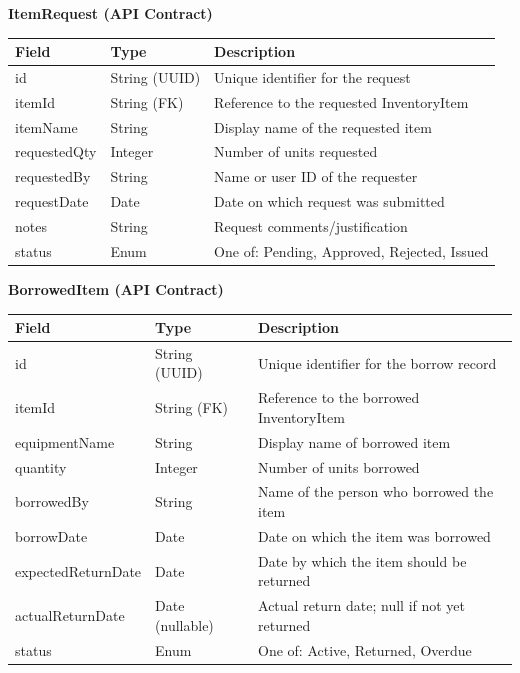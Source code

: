 \documentclass[12pt]{article}
\begin{document}
\textbf{ItemRequest (API Contract)}

\begin{center}
\begin{tabular}{|l|l|p{7cm}|}
\hline
\textbf{Field} & \textbf{Type} & \textbf{Description} \\
\hline
id & String (UUID) & Unique identifier for the request \\
itemId & String (FK) & Reference to the requested InventoryItem \\
itemName & String & Display name of the requested item \\
requestedQty & Integer & Number of units requested \\
requestedBy & String & Name or user ID of the requester \\
requestDate & Date & Date on which request was submitted \\
notes & String & Request comments/justification \\
status & Enum & One of: Pending, Approved, Rejected, Issued \\
\hline
\end{tabular}
\end{center}

\textbf{BorrowedItem (API Contract)}

\begin{center}
\begin{tabular}{|l|l|p{7cm}|}
\hline
\textbf{Field} & \textbf{Type} & \textbf{Description} \\
\hline
id & String (UUID) & Unique identifier for the borrow record \\
itemId & String (FK) & Reference to the borrowed InventoryItem \\
equipmentName & String & Display name of borrowed item \\
quantity & Integer & Number of units borrowed \\
borrowedBy & String & Name of the person who borrowed the item \\
borrowDate & Date & Date on which the item was borrowed \\
expectedReturnDate & Date & Date by which the item should be returned \\
actualReturnDate & Date (nullable) & Actual return date; null if not yet returned \\
status & Enum & One of: Active, Returned, Overdue \\
\hline
\end{tabular}
\end{center}
\end{document}
